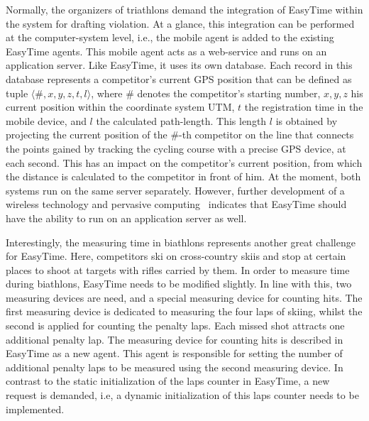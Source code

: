\documentclass[preprint, prX]{revtex4}
\begin{document}
Normally, the organizers of triathlons demand the integration of EasyTime within the system for drafting violation. At a glance, this integration can be performed at the computer-system level, i.e., the mobile agent is added to the existing EasyTime agents. This mobile agent acts as a web-service and runs on an application server. Like EasyTime, it uses its own database. Each record in this database represents a competitor's current GPS position that can be defined as tuple $\langle \#,x,y,z,t,l \rangle$, where $\#$ denotes the competitor's starting number, $x,y,z$ his current position within the coordinate system UTM, $t$ the registration time in the mobile device, and $l$ the calculated path-length. This length $l$ is obtained by projecting the current position of the $\#$-th competitor on the line that connects the points gained by tracking the cycling course with a precise GPS device, at each second. This has an impact on the competitor's current position, from which the distance is calculated to the competitor in front of him.
At the moment, both systems run on the same server separately.  However, further development of a wireless technology and pervasive computing~\cite{Weiser:1991} indicates that EasyTime should have the ability to run on an application server as well.

Interestingly, the measuring time in biathlons represents another great challenge for EasyTime. Here, competitors ski on cross-country skiis and stop at certain places to shoot at targets with rifles carried by them. In order to measure time during biathlons, EasyTime needs to be modified slightly. In line with this, two measuring devices are need, and a special measuring device for counting hits. The first measuring device is dedicated to measuring the four laps of skiing, whilst the second is applied for counting the penalty laps. Each missed shot attracts one additional penalty lap. The measuring device for counting hits is described in EasyTime as a new agent. This agent is responsible for setting the number of additional penalty laps to be measured using the second measuring device. In contrast to the static initialization of the laps counter in EasyTime, a new request is demanded, i.e, a dynamic initialization of this laps counter needs to be implemented.
\end{document}

